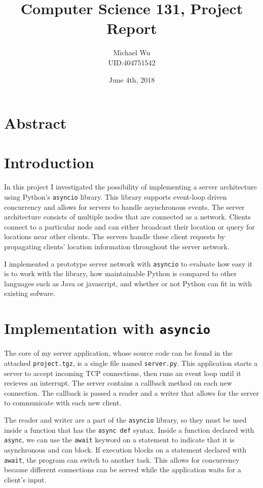 \documentclass[letterpaper,twocolumn,10pt]{article}
\begin{document}
\title{\Large \bf Computer Science 131, Project Report}
\author{Michael Wu\\UID:404751542}
\date{June 4th, 2018}
\maketitle

\section{Abstract}

\section{Introduction}

In this project I investigated the possibility of implementing a server architecture using Python's
\texttt{asyncio} library. This library supports event-loop driven concurrency and allows for servers
to handle asynchronous events. The server architecture consists of multiple nodes that are connected
as a network. Clients connect to a particular node and can either broadcast their location or query for
locations near other clients. The servers handle these client requests by propagating clients' location
information throughout the server network.

I implemented a prototype server network with \texttt{asyncio} to evaluate how easy it is to work with
the library, how maintainable Python is compared to other languages such as Java or javascript, and whether
or not Python can fit in with existing sofware.

\section{Implementation with \texttt{asyncio}}

The core of my server application, whose source code can be found in the attached \texttt{project.tgz}, is a single
file named \texttt{server.py}. This application starts a server to accept incoming TCP connections, then runs an event loop
until it recieves an interrupt. The server contains a callback method on each new connection. The callback is passed
a reader and a writer that allows for the server to communicate with each new client.

The reader and writer are a part of the \texttt{asyncio} library, so they must be used inside a function that has
the \texttt{async def} syntax. Inside a function declared with \texttt{async}, we can use the \texttt{await} keyword
on a statement to indicate that it is asynchronous and can block. If execution blocks on a statement declared with
\texttt{await}, the program can switch to another task. This allows for concurrency because different connections
can be served while the application waits for a client's input.
\end{document}
